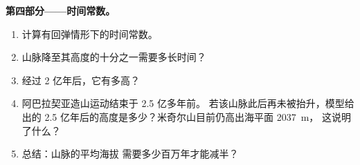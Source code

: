 \begin{problem}
\medskip
\noindent\textbf{第四部分——时间常数。}
\begin{enumerate}[resume]
  \item 计算有回弹情形下的时间常数。
  \item 山脉降至其高度的十分之一需要多长时间？
  \item 经过 2 亿年后，它有多高？
  \item 阿巴拉契亚造山运动结束于 2.5 亿多年前。
        若该山脉此后再未被抬升，模型给出的
        2.5 亿年后的高度是多少？米奇尔山目前仍高出海平面 \qty{2037}{m}，
        这说明了什么？
  \item 总结：山脉的平均海拔
        需要多少百万年才能减半？
\end{enumerate}
\end{problem}
